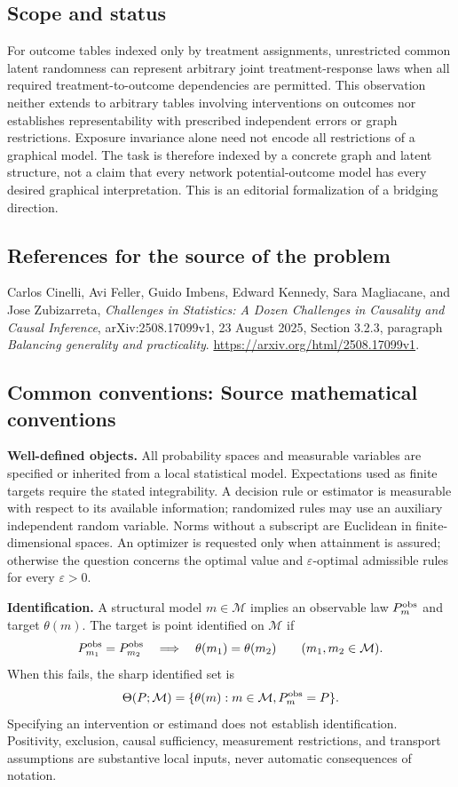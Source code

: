 \documentclass[11pt,a4paper]{article}
\begin{document}
\subsection*{Scope and status}
For outcome tables indexed only by treatment assignments, unrestricted common latent randomness can represent arbitrary joint treatment-response laws when all required treatment-to-outcome dependencies are permitted. This observation neither extends to arbitrary tables involving interventions on outcomes nor establishes representability with prescribed independent errors or graph restrictions. Exposure invariance alone need not encode all restrictions of a graphical model. The task is therefore indexed by a concrete graph and latent structure, not a claim that every network potential-outcome model has every desired graphical interpretation. This is an editorial formalization of a bridging direction.
\subsection*{References for the source of the problem}
Carlos Cinelli, Avi Feller, Guido Imbens, Edward Kennedy, Sara Magliacane, and Jose Zubizarreta, \emph{Challenges in Statistics: A Dozen Challenges in Causality and Causal Inference}, arXiv:2508.17099v1, 23 August 2025, Section 3.2.3, paragraph \emph{Balancing generality and practicality}. \url{https://arxiv.org/html/2508.17099v1}.

\subsection*{Common conventions: Source mathematical conventions}

\textbf{Well-defined objects.}
All probability spaces and measurable variables are specified or inherited
from a local statistical model. Expectations used as finite targets require
the stated integrability. A decision rule or estimator is measurable with
respect to its available information; randomized rules may use an auxiliary
independent random variable. Norms without a subscript are Euclidean in
finite-dimensional spaces. An optimizer is requested only when attainment
is assured; otherwise the question concerns the optimal value and
$\varepsilon$-optimal admissible rules for every $\varepsilon>0$.

\textbf{Identification.}
A structural model $m\in\mathcal M$ implies an observable law
$P_m^{\rm obs}$ and target $\theta(m)$. The target is point identified on
$\mathcal M$ if
\[
 P_{m_1}^{\rm obs}=P_{m_2}^{\rm obs}
 \quad\Longrightarrow\quad\theta(m_1)=\theta(m_2)
 \qquad(m_1,m_2\in\mathcal M).
\]
When this fails, the sharp identified set is
\[
 \Theta(P;\mathcal M)=\{\theta(m):m\in\mathcal M,
                                  P_m^{\rm obs}=P\}.
\]
Specifying an intervention or estimand does not establish identification.
Positivity, exclusion, causal sufficiency, measurement restrictions, and
transport assumptions are substantive local inputs, never automatic
consequences of notation.
\end{document}
